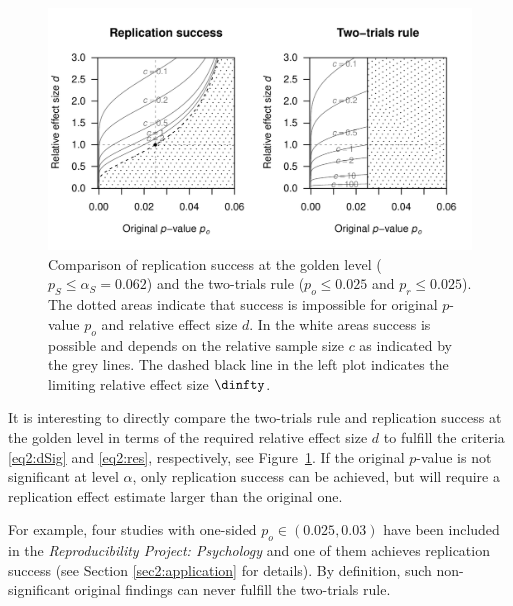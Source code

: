 \begin{figure}[!h]
\centering
\begin{knitrout}
\color{fgcolor}

{\centering \includegraphics[width=\maxwidth]{images/paper2/fig2-1}

}


\end{knitrout}
\caption{Comparison of replication success at the golden level
  ($p_S \leq \alpha_S = 0.062$) and the two-trials rule ($p_o \leq 0.025$ and
  $p_r \leq 0.025$). The dotted areas indicate that success is impossible for
  original $p$-value $p_o$ and relative effect size $d$. In the white areas
  success is possible and depends on the relative sample size $c$ as indicated
  by the grey lines. The dashed black line in the left plot indicates the
  limiting relative effect size $\dinfty$. }
\label{fig2:fig2}
\end{figure}



It is interesting to directly compare the two-trials rule and replication
success at the golden level in terms of the required relative effect size $d$ to
fulfill the criteria \eqref{eq2:dSig} and \eqref{eq2:res}, respectively, see
Figure~\ref{fig2:fig2}. If the original $p$-value is not significant at level
$\alpha$, only replication success can be achieved, but will require a
replication effect estimate larger than the original one.

For example, four studies with one-sided $p_o \in (0.025, 0.03)$ have been
included in the \textit{Reproducibility Project: Psychology} \citep{Opensc2015}
and one of them achieves replication success (see Section \ref{sec2:application}
for details). By definition, such non-significant original findings can never
fulfill the two-trials rule.

